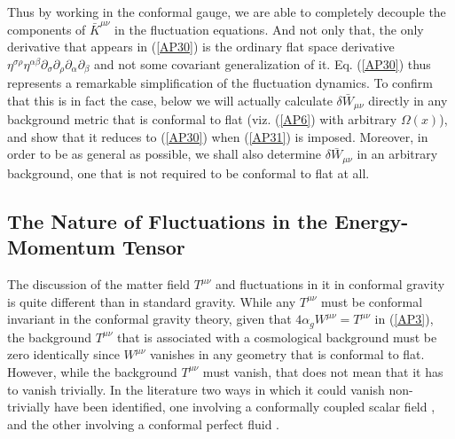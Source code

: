 \documentclass[aps]{revtex4}
\begin{document}
Thus by working in the conformal gauge,  we are able to completely decouple the components of $\bar{K}^{\mu\nu}$ in the fluctuation equations. And not only that, the only derivative that appears in (\ref{AP30}) is the ordinary flat space derivative $\eta^{\sigma\rho}\eta^{\alpha\beta}\partial_{\sigma}\partial_{\rho} \partial_{\alpha}\partial_{\beta}$ and not some covariant generalization of it. Eq. (\ref{AP30}) thus represents a remarkable simplification of the fluctuation dynamics. To confirm that this is in fact the case, below we will actually calculate $\delta \bar{W}_{\mu\nu}$ directly in any background metric that is conformal to flat (viz. (\ref{AP6}) with arbitrary $\Omega(x)$),  and show that it reduces to (\ref{AP30}) when (\ref{AP31}) is imposed. Moreover, in order to be as general as possible, we shall also determine $\delta \bar{W}_{\mu\nu}$ in an arbitrary background, one that is not required to be conformal to flat at all.


\subsection{The Nature of Fluctuations in the Energy-Momentum Tensor}

The discussion of the matter field $T^{\mu\nu}$ and fluctuations in it in conformal gravity is quite different than in standard gravity. While any $T^{\mu\nu}$ must be conformal invariant in the conformal gravity theory, given that $4\alpha_gW^{\mu\nu}=T^{\mu\nu}$ in (\ref{AP3}), the  background $T^{\mu\nu}$ that is associated with a cosmological background must be zero identically since $W^{\mu\nu}$ vanishes in any geometry that is conformal to flat. However, while the background $T^{\mu\nu}$ must vanish, that does not mean that it has to vanish trivially. In the literature two ways in which it could vanish non-trivially have been identified, one involving a conformally coupled scalar field \cite{Mannheim1990}, and the other involving a conformal perfect fluid \cite{Mannheim2000}.
\end{document}
